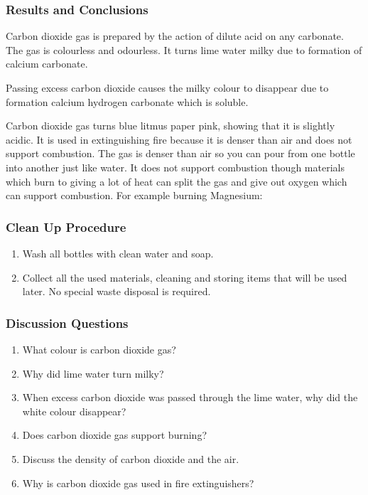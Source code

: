 \subsubsection*{Results and Conclusions}
Carbon dioxide gas is prepared by the action of dilute acid on any carbonate. The gas is colourless and odourless. It turns lime water milky due to formation of calcium carbonate.  
\begin{center}
\end{center}
Passing excess carbon dioxide causes the milky colour to disappear due to formation calcium hydrogen carbonate which is soluble.
\begin{center}
\end{center}
Carbon dioxide gas turns blue litmus paper pink, showing that it is slightly acidic. It is used in extinguishing fire because it is denser than air and does not support combustion.
The gas is denser than air so you can pour from one bottle into another just like water. It does not support combustion though materials which burn to giving a lot of heat can split the gas and give out oxygen which can support combustion. For example burning Magnesium:
\begin{center}
\end{center}

\subsubsection*{Clean Up Procedure}
\begin{enumerate}
\item{Wash all bottles with clean water and soap.}
\item{Collect all the used materials, cleaning and storing items that will be used later. No special waste disposal is required.}
\end{enumerate}

\subsubsection*{Discussion Questions}
\begin{enumerate}
\item{What colour is carbon dioxide gas?}
\item{Why did lime water turn milky?}
\item{When excess carbon dioxide was passed through the lime water, why did the white colour disappear?}
\item{Does carbon dioxide gas support burning?}
\item{Discuss the density of carbon dioxide and the air.}
\item{Why is carbon dioxide gas used in fire extinguishers?}
\end{enumerate}

